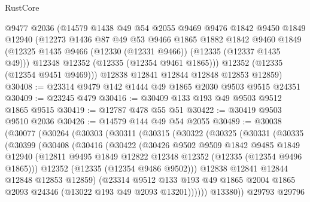 \begin{lexlean}{RustCore}
\begin{coremodule}
      @9477
      @2036
      (@14579
        @1438
        @49
        @54
        @2055
        @9469
        @9476
        @1842
        @9450
        @1849
        @12940
        (@12273
          @1436
          @87
          @49
          @53
          @9466
          @1865
          @1882
          @1842
          @9460
          @1849
          (@12325 @1435 @9466 (@12330 (@12331 @9466)) (@12335 (@12337 @1435 @49)))
          @12348
          @12352
          (@12335 (@12354 @9461 @1865)))
        @12352
        (@12335 (@12354 @9451 @9469)))
      @12838
      @12841
      @12844
      @12848
      @12853
      @12859)
@30408 := @23314 @9479 @142 @1444 @49 @1865 @2030 @9503 @9515 @24351
@30409 := @23245 @479
@30416 := @30409 @133 @193 @49 @9503 @9512 @1865 @9515
@30419 := @12787 @478 @55 @51
@30422 := @30419 @9503 @9510 @2036
@30426 := @14579 @144 @49 @54 @2055
@30489 := @30038
    (@30077
      (@30264
        (@30303
          (@30311
            (@30315
              (@30322
                (@30325
                  (@30331
                    (@30335
                      (@30399
                        (@30408
                          (@30416
                            (@30422
                              (@30426
                                @9502
                                @9509
                                @1842
                                @9485
                                @1849
                                @12940
                                (@12811
                                  @9495
                                  @1849
                                  @12822
                                  @12348
                                  @12352
                                  (@12335 (@12354 @9496 @1865)))
                                @12352
                                (@12335 (@12354 @9486 @9502)))
                              @12838
                              @12841
                              @12844
                              @12848
                              @12853
                              @12859)
                            (@23314
                              @9512
                              @133
                              @193
                              @49
                              @1865
                              @2004
                              @1865
                              @2093
                              @24346
                              (@13022 @193 @49 @2093 @13201))))))
                    @13380))
                @29793
                @29796

\end{coremodule}
\end{lexlean}
